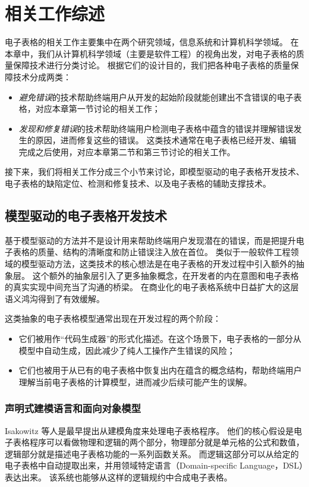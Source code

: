 \chapter{相关工作综述}
电子表格的相关工作主要集中在两个研究领域，信息系统和计算机科学领域。
在本章中，我们从计算机科学领域（主要是软件工程）的视角出发，对电子表格的质量保障技术进行分类讨论。
根据它们的设计目的，我们把各种电子表格的质量保障技术分成两类：
\begin{itemize}
    \item \textit{避免错误}的技术帮助终端用户从开发的起始阶段就能创建出不含错误的电子表格，对应本章第一节讨论的相关工作；
    \item \textit{发现和修复错误}的技术帮助终端用户检测电子表格中蕴含的错误并理解错误发生的原因，进而修复这些的错误。
    这类技术通常在电子表格已经开发、编辑完成之后使用，对应本章第二节和第三节讨论的相关工作。
\end{itemize}

接下来，我们将相关工作分成三个小节来讨论，即模型驱动的电子表格开发技术、电子表格的缺陷定位、检测和修复技术、以及电子表格的辅助支撑技术。


\section{模型驱动的电子表格开发技术}
基于模型驱动的方法并不是设计用来帮助终端用户发现潜在的错误，而是把提升电子表格的质量、结构的清晰度和防止错误注入放在首位。
类似于一般软件工程领域的模型驱动方法，这类技术的核心想法是在电子表格的开发过程中引入额外的抽象层。
这个额外的抽象层引入了更多抽象概念，在开发者的内在意图和电子表格的真实实现中间充当了沟通的桥梁。
在商业化的电子表格系统中日益扩大的这层语义鸿沟\cite{luckey2012systematic}得到了有效缓解。

这类抽象的电子表格模型通常出现在开发过程的两个阶段：
\begin{itemize}
    \item 它们被用作“代码生成器”的形式化描述。在这个场景下，电子表格的一部分从模型中自动生成，因此减少了纯人工操作产生错误的风险；
    \item 它们也被用于从已有的电子表格中恢复出内在蕴含的概念结构，帮助终端用户理解当前电子表格的计算模型，进而减少后续可能产生的误解。
\end{itemize}

\subsection{声明式建模语言和面向对象模型}
Isakowitz 等人\cite{isakowitz1995toward}是最早提出从建模角度来处理电子表格程序。
他们的核心假设是电子表格程序可以看做物理和逻辑的两个部分，物理部分就是单元格的公式和数值，逻辑部分就是描述电子表格功能的一系列函数关系。
而逻辑这部分可以从给定的电子表格中自动提取出来，并用领域特定语言（Domain-specific Language，DSL）表达出来。
该系统也能够从这样的逻辑规约中合成电子表格。

